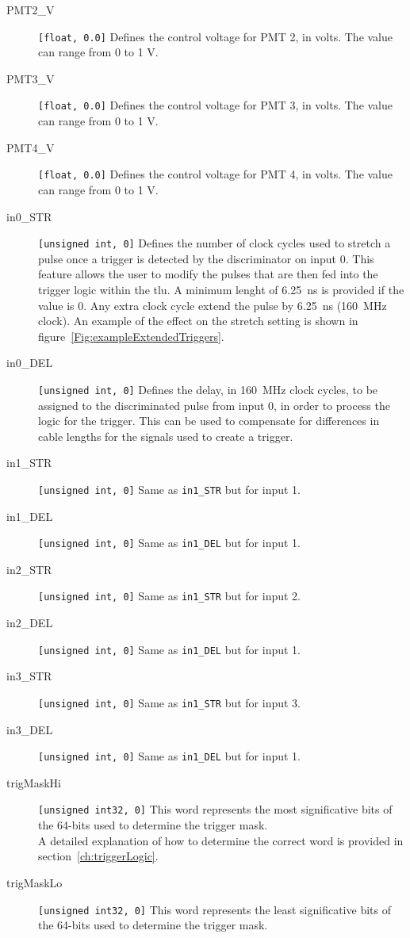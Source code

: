 \begin{description}
  \item[PMT2\_V] \verb|[float, 0.0]| Defines the control voltage for PMT 2, in volts. The value can range from 0 to 1 V.
  \item[PMT3\_V] \verb|[float, 0.0]| Defines the control voltage for PMT 3, in volts. The value can range from 0 to 1 V.
  \item[PMT4\_V] \verb|[float, 0.0]| Defines the control voltage for PMT 4, in volts. The value can range from 0 to 1 V.
  \item[in0\_STR] \verb|[unsigned int, 0]| Defines the number of clock cycles used to stretch a pulse once a trigger is detected by the discriminator on input 0. This feature allows the user to modify the pulses that are then fed into the trigger logic within the \gls{tlu}.
      A minimum lenght of 6.25~ns is provided if the value is 0. Any extra clock cycle extend the pulse by 6.25~ns (160~MHz clock). An example of the effect on the stretch setting is shown in figure~\ref{Fig:exampleExtendedTriggers}.
  \item[in0\_DEL] \verb|[unsigned int, 0]| Defines the delay, in 160~MHz clock cycles, to be assigned to the discriminated pulse from input 0, in order to process the logic for the trigger. This can be used to compensate for differences in cable lengths for the signals used to create a trigger.
  \item[in1\_STR] \verb|[unsigned int, 0]| Same as \texttt{in1\_STR} but for input 1.
  \item[in1\_DEL] \verb|[unsigned int, 0]| Same as \texttt{in1\_DEL} but for input 1.
  \item[in2\_STR] \verb|[unsigned int, 0]| Same as \texttt{in1\_STR} but for input 2.
  \item[in2\_DEL] \verb|[unsigned int, 0]| Same as \texttt{in1\_DEL} but for input 1.
  \item[in3\_STR] \verb|[unsigned int, 0]| Same as \texttt{in1\_STR} but for input 3.
  \item[in3\_DEL] \verb|[unsigned int, 0]| Same as \texttt{in1\_DEL} but for input 1.
  \item[trigMaskHi] \verb|[unsigned int32, 0]| This word represents the most significative bits of the 64-bits used to determine the trigger mask.\\
        A detailed explanation of how to determine the correct word is provided in section~\ref{ch:triggerLogic}.
  \item[trigMaskLo] \verb|[unsigned int32, 0]| This word represents the least significative bits of the 64-bits used to determine the trigger mask.\\

\end{description}
